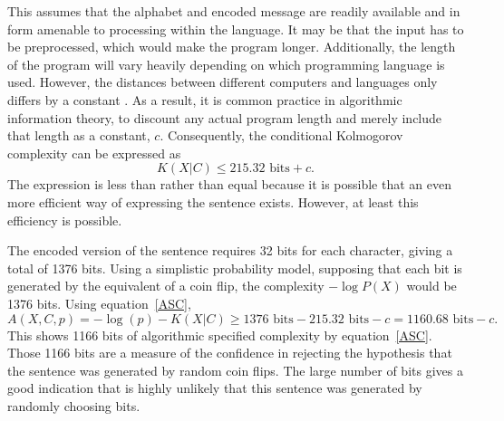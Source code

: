 This assumes that the alphabet and encoded message are readily available and in form amenable to processing within the language.
It may be that the input has to be preprocessed, which would make the program longer.
Additionally, the length of the program will vary heavily depending on which programming language is used.
However, the distances between different computers and languages only differs by a constant \citep{Cover2006}.
As a result, it is common practice in algorithmic information theory, to discount any actual program length and merely include that length 
as a constant, $c$. 
Consequently, the conditional Kolmogorov complexity can be expressed as 
\begin{equation}
    \label{kc.alpha}
    K(X|C) \leq 215.32 \mbox{ bits} + c \mbox{.}
\end{equation}
The expression is less than rather than equal because it is possible that an even more efficient way of expressing the sentence exists.
However, at least this efficiency is possible.

The encoded version of the sentence requires 32 bits for each character, giving a total of 1376 bits.
Using a simplistic probability model, supposing that each bit is generated by the equivalent of a coin flip,
the complexity $-\log P(X)$ would be 1376 bits.
Using equation~\ref{ASC},
\begin{equation}
    A(X,C,p) = -\log(p) - K(X|C) \geq 1376 \mbox{ bits} - 215.32 \mbox{ bits} - c  = 1160.68 \mbox{ bits} - c \mbox{.}
\end{equation}
This shows 1166 bits of algorithmic specified complexity by equation~\ref{ASC}.
Those 1166 bits are a measure of the confidence in rejecting the hypothesis that the sentence was generated by random coin flips.
The large number of bits gives a good indication that is highly unlikely that this sentence was generated by randomly choosing bits.

